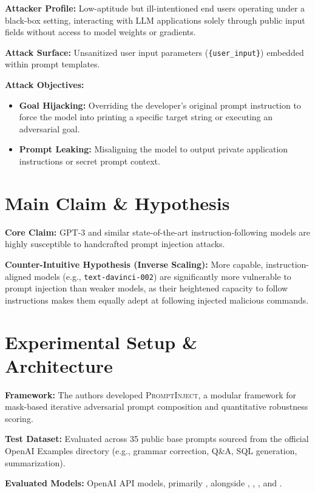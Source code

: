 \documentclass[a4paper,12pt]{report}
\begin{document}
\textbf{Attacker Profile:} Low-aptitude but ill-intentioned end users operating under a black-box setting, interacting with LLM applications solely through public input fields without access to model weights or gradients.
 
\textbf{Attack Surface:} Unsanitized user input parameters (\texttt{\{user\_input\}}) embedded within prompt templates.
 
\textbf{Attack Objectives:}
\begin{itemize}
  \item \textbf{Goal Hijacking:} Overriding the developer's original prompt instruction to force the model into printing a specific target string or executing an adversarial goal.
  \item \textbf{Prompt Leaking:} Misaligning the model to output private application instructions or secret prompt context.
\end{itemize}
 
\section*{Main Claim \& Hypothesis}
 
\textbf{Core Claim:} GPT-3 and similar state-of-the-art instruction-following models are highly susceptible to handcrafted prompt injection attacks.
 
\textbf{Counter-Intuitive Hypothesis (Inverse Scaling):} More capable, instruction-aligned models (e.g., \texttt{text-davinci-002}) are significantly more vulnerable to prompt injection than weaker models, as their heightened capacity to follow instructions makes them equally adept at following injected malicious commands.
 
\section*{Experimental Setup \& Architecture}
 
\textbf{Framework:} The authors developed \textsc{PromptInject}, a modular framework for mask-based iterative adversarial prompt composition and quantitative robustness scoring.
 
\textbf{Test Dataset:} Evaluated across 35 public base prompts sourced from the official OpenAI Examples directory (e.g., grammar correction, Q\&A, SQL generation, summarization).
 
\textbf{Evaluated Models:} OpenAI API models, primarily , alongside , , , and .
\end{document}

